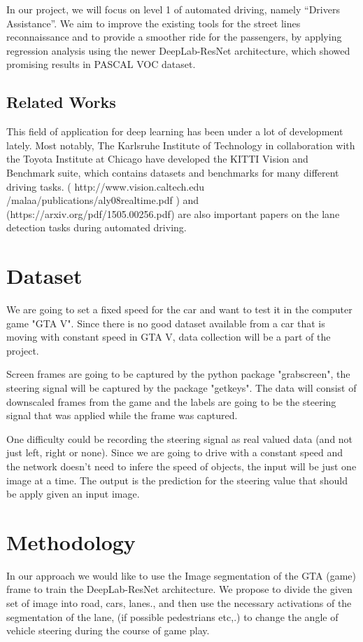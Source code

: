\documentclass[10pt,twocolumn,letterpaper]{article}
\begin{document}
In our project, we will focus on level 1 of automated driving, namely “Drivers Assistance”. We aim to improve the existing tools for the street lines reconnaissance and to provide a smoother ride for the passengers, by applying regression analysis using the newer DeepLab-ResNet architecture, which showed promising results in PASCAL VOC dataset.

\subsection{Related Works}

This field of application for deep learning has been under a lot of development lately. Most notably, The Karlsruhe Institute of Technology in collaboration with the Toyota Institute at Chicago have developed the KITTI Vision and Benchmark suite, which contains datasets and benchmarks for many different driving tasks. ( http://www.vision.caltech.edu /malaa/publications/aly08realtime.pdf ) and (https://arxiv.org/pdf/1505.00256.pdf) are also important papers on the lane detection tasks during automated driving.

\section{Dataset}
We are going to set a fixed speed for the car and want to test it in the computer game "GTA V". Since there is no good dataset available from a car that is moving with constant speed in GTA V, data collection will be a part of the project.  
 
Screen frames are going to be captured by the python package "grabscreen", the steering signal will be captured by the package "getkeys". The data will consist of downscaled frames from the game and the labels are going to be the steering signal that was applied while the frame was captured.

One difficulty could be recording the steering signal as real valued data (and not just left, right or none). Since we are going to drive with a constant speed and the network doesn't need to infere the speed of objects, the input will be just one image at a time. The output is the prediction for the steering value that should be apply given an input image.

\section{Methodology}
In our approach we would like to use the Image segmentation of the GTA (game) frame to train the DeepLab-ResNet architecture. We propose to divide the given set of image into road, cars, lanes., and then use the 
necessary activations of the segmentation of the lane, (if possible pedestrians etc,.) to change the angle of vehicle steering during the course of game play.
\end{document}
